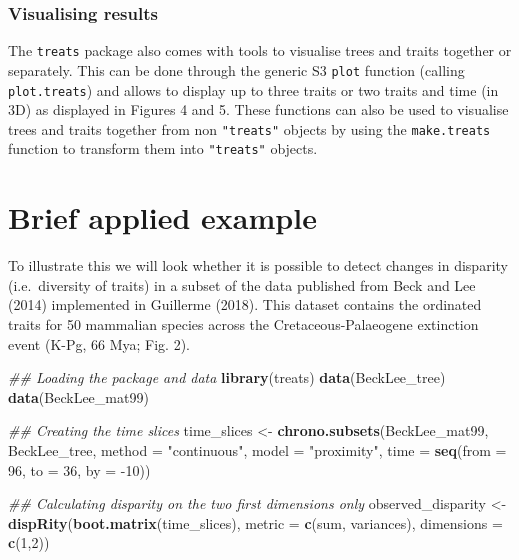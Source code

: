 \documentclass[
]{article}
\newenvironment{Shaded}{\begin{snugshade}}{\end{snugshade}}
\newcommand{\CommentTok}[1]{\textcolor[rgb]{0.56,0.35,0.01}{\textit{#1}}}
\newcommand{\DataTypeTok}[1]{\textcolor[rgb]{0.13,0.29,0.53}{#1}}
\newcommand{\DecValTok}[1]{\textcolor[rgb]{0.00,0.00,0.81}{#1}}
\newcommand{\KeywordTok}[1]{\textcolor[rgb]{0.13,0.29,0.53}{\textbf{#1}}}
\newcommand{\NormalTok}[1]{#1}
\newcommand{\StringTok}[1]{\textcolor[rgb]{0.31,0.60,0.02}{#1}}
\begin{document}
\hypertarget{visualising-results}{%
\subsubsection{Visualising results}\label{visualising-results}}

The \texttt{treats} package also comes with tools to visualise trees and
traits together or separately. This can be done through the generic S3
\texttt{plot} function (calling \texttt{plot.treats}) and allows to
display up to three traits or two traits and time (in 3D) as displayed
in Figures 4 and 5. These functions can also be used to visualise trees
and traits together from non \texttt{"treats"} objects by using the
\texttt{make.treats} function to transform them into \texttt{"treats"}
objects.

\hypertarget{brief-applied-example}{%
\section{Brief applied example}\label{brief-applied-example}}

To illustrate this we will look whether it is possible to detect changes
in disparity (i.e.~diversity of traits) in a subset of the data
published from Beck and Lee (2014) implemented in Guillerme (2018). This
dataset contains the ordinated traits for 50 mammalian species across
the Cretaceous-Palaeogene extinction event (K-Pg, 66 Mya; Fig. 2).

\begin{Shaded}
\begin{Highlighting}[]
\CommentTok{\#\# Loading the package and data}
\KeywordTok{library}\NormalTok{(treats)}
\KeywordTok{data}\NormalTok{(BeckLee\_tree)}
\KeywordTok{data}\NormalTok{(BeckLee\_mat99)}

\CommentTok{\#\# Creating the time slices}
\NormalTok{time\_slices \textless{}{-}}\StringTok{ }\KeywordTok{chrono.subsets}\NormalTok{(BeckLee\_mat99, BeckLee\_tree,}
                              \DataTypeTok{method =} \StringTok{"continuous"}\NormalTok{,}
                              \DataTypeTok{model  =} \StringTok{"proximity"}\NormalTok{,}
                              \DataTypeTok{time   =} \KeywordTok{seq}\NormalTok{(}\DataTypeTok{from =} \DecValTok{96}\NormalTok{, }\DataTypeTok{to =} \DecValTok{36}\NormalTok{, }\DataTypeTok{by =} \DecValTok{{-}10}\NormalTok{))}

\CommentTok{\#\# Calculating disparity on the two first dimensions only}
\NormalTok{observed\_disparity \textless{}{-}}\StringTok{ }\KeywordTok{dispRity}\NormalTok{(}\KeywordTok{boot.matrix}\NormalTok{(time\_slices),}
                               \DataTypeTok{metric =} \KeywordTok{c}\NormalTok{(sum, variances),}
                               \DataTypeTok{dimensions =} \KeywordTok{c}\NormalTok{(}\DecValTok{1}\NormalTok{,}\DecValTok{2}\NormalTok{))}
\end{Highlighting}
\end{Shaded}
\end{document}
